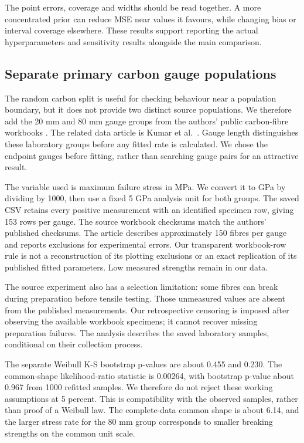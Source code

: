 The point errors, coverage and widths should be read together. A more concentrated prior can reduce MSE near values it favours, while changing bias or interval coverage elsewhere. These results support reporting the actual hyperparameters and sensitivity results alongside the main comparison.
\FloatBarrier

\subsection{Separate primary carbon gauge populations}\label{sec:primary-data}
The random carbon split is useful for checking behaviour near a population boundary, but it does not provide two distinct source populations. We therefore add the 20 mm and 80 mm gauge groups from the authors' public carbon-fibre workbooks \cite{KumarData2020}. The related data article is Kumar et al.\ \cite{Kumar2024}. Gauge length distinguishes these laboratory groups before any fitted rate is calculated. We chose the endpoint gauges before fitting, rather than searching gauge pairs for an attractive result.

The variable used is maximum failure stress in MPa. We convert it to GPa by dividing by 1000, then use a fixed 5 GPa analysis unit for both groups. The saved CSV retains every positive measurement with an identified specimen row, giving 153 rows per gauge. The source workbook checksums match the authors' published checksums. The article describes approximately 150 fibres per gauge and reports exclusions for experimental errors. Our transparent workbook-row rule is not a reconstruction of its plotting exclusions or an exact replication of its published fitted parameters. Low measured strengths remain in our data.

The source experiment also has a selection limitation: some fibres can break during preparation before tensile testing. Those unmeasured values are absent from the published measurements. Our retrospective censoring is imposed after observing the available workbook specimens; it cannot recover missing preparation failures. The analysis describes the saved laboratory samples, conditional on their collection process.



The separate Weibull K-S bootstrap p-values are about 0.455 and 0.230. The common-shape likelihood-ratio statistic is 0.00264, with bootstrap p-value about 0.967 from 1000 refitted samples. We therefore do not reject these working assumptions at 5 percent. This is compatibility with the observed samples, rather than proof of a Weibull law. The complete-data common shape is about 6.14, and the larger stress rate for the 80 mm group corresponds to smaller breaking strengths on the common unit scale.


